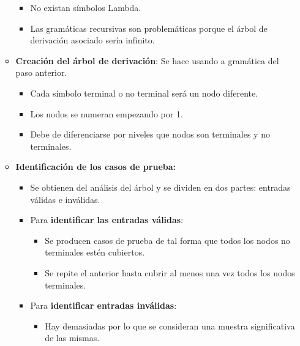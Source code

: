 \documentclass[12pt, twoside, openright]{report} %
\begin{document}
\begin{itemize}
\begin{itemize}
\begin{itemize}
    \item No existan símbolos Lambda.
      
    \item Las gramáticas recursivas son problemáticas porque el árbol de
      derivación asociado sería infinito.
      
    \end{itemize}
  \item \textbf{Creación del árbol de derivación}: Se hace usando a
    gramática del paso anterior.
    

    \begin{itemize}
    \item Cada símbolo terminal o no terminal será un nodo diferente.
      
    \item Los nodos se numeran empezando por 1.
      
    \item Debe de diferenciarse por niveles que nodos son terminales y no
      terminales.
      
    \end{itemize}
  \item \textbf{Identificación de los casos de prueba:}
    

    \begin{itemize}
    \item Se obtienen del análisis del árbol y se dividen en dos partes:
      entradas válidas e inválidas.
      
    \item Para \textbf{identificar las entradas válidas}:
      

      \begin{itemize}
      \item Se producen casos de prueba de tal forma que todos los nodos no
        terminales estén cubiertos.
        
      \item Se repite el anterior hasta cubrir al menos una vez todos los
        nodos terminales.
        
      \end{itemize}
    \item Para \textbf{identificar entradas inválidas}:
      

      \begin{itemize}
      \item Hay demasiadas por lo que se consideran una muestra
        significativa de las mismas.
        

\end{itemize}
\end{itemize}
\end{itemize}
\end{itemize}
\end{document}
